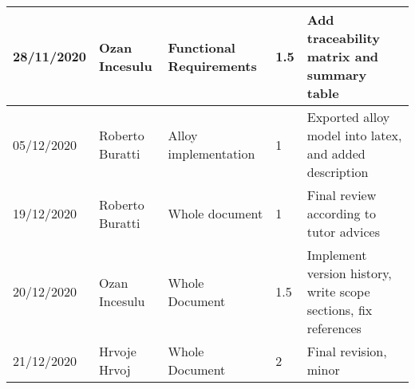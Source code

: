 \begin{table}[H]
\begin{tabular}{|p{2cm}|p{2.5cm}|p{2cm}|p{1.5cm}|p{8cm}|}
        28/11/2020 & Ozan Incesulu   & Functional Requirements & 1.5           & Add traceability matrix and summary table\\ \hline
        05/12/2020 & Roberto Buratti & Alloy implementation & 1                & Exported alloy model into latex, and added description \\ \hline
        19/12/2020 & Roberto Buratti & Whole document       & 1                & Final review according to tutor advices \\ \hline
        20/12/2020 & Ozan Incesulu   & Whole Document       & 1.5              & Implement version history, write scope sections, fix references \\ \hline
        21/12/2020 & Hrvoje Hrvoj    & Whole Document       & 2                & Final revision, minor
    \end{tabular}
\end{table}
